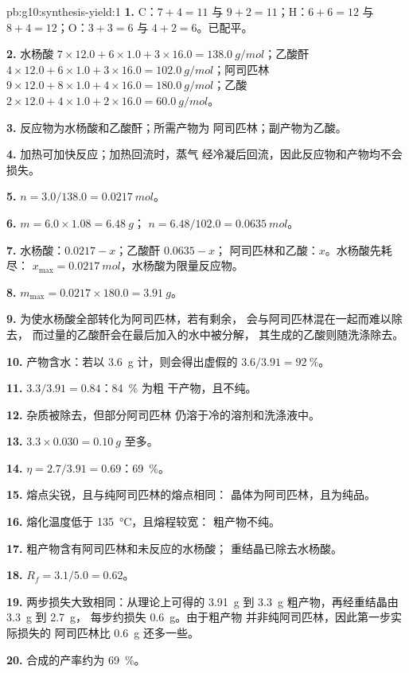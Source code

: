 \begin{solution}{pb:g10:synthesis-yield:1}
\textbf{1.} C：$7 + 4 = 11$ 与 $9 + 2 = 11$；H：$6 + 6 = 12$ 与
$8 + 4 = 12$；O：$3 + 3 = 6$ 与 $4 + 2 = 6$。已配平。

\textbf{2.} 水杨酸 $7 \times 12.0 + 6 \times 1.0 + 3 \times 16.0
= \qty{138.0}{g/mol}$；乙酸酐 $4 \times 12.0 + 6 \times 1.0 +
3 \times 16.0 = \qty{102.0}{g/mol}$；阿司匹林 $9 \times 12.0 + 8 \times
1.0 + 4 \times 16.0 = \qty{180.0}{g/mol}$；乙酸 $2 \times 12.0
+ 4 \times 1.0 + 2 \times 16.0 = \qty{60.0}{g/mol}$。

\textbf{3.} 反应物为水杨酸和乙酸酐；所需产物为
阿司匹林；副产物为乙酸。

\textbf{4.} 加热可加快反应；加热回流时，蒸气
经冷凝后回流，因此反应物和产物均不会损失。

\textbf{5.} $n = 3.0 / 138.0 = \qty{0.0217}{mol}$。

\textbf{6.} $m = 6.0 \times 1.08 = \qty{6.48}{g}$；
$n = 6.48 / 102.0 = \qty{0.0635}{mol}$。

\textbf{7.} 水杨酸：$0.0217 - x$；乙酸酐 $0.0635 - x$；
阿司匹林和乙酸：$x$。水杨酸先耗尽：
$x_{\max} = \qty{0.0217}{mol}$，水杨酸为限量反应物。

\textbf{8.} $m_{\max} = 0.0217 \times 180.0 = \qty{3.91}{g}$。

\textbf{9.} 为使水杨酸全部转化为阿司匹林，若有剩余，
会与阿司匹林混在一起而难以除去，
而过量的乙酸酐会在最后加入的水中被分解，
其生成的乙酸则随洗涤除去。

\textbf{10.} 产物含水：若以 \qty{3.6}{g} 计，则会得出虚假的
$3.6 / 3.91 = \qty{92}{\percent}$。

\textbf{11.} $3.3 / 3.91 = 0.84$：\qty{84}{\percent} 为粗
干产物，且不纯。

\textbf{12.} 杂质被除去，但部分阿司匹林
仍溶于冷的溶剂和洗涤液中。

\textbf{13.} $3.3 \times 0.030 = \qty{0.10}{g}$ 至多。

\textbf{14.} $\eta = 2.7 / 3.91 = 0.69$：\qty{69}{\percent}。

\textbf{15.} 熔点尖锐，且与纯阿司匹林的熔点相同：
晶体为阿司匹林，且为纯品。

\textbf{16.} 熔化温度低于 \qty{135}{\celsius}，且熔程较宽：
粗产物不纯。

\textbf{17.} 粗产物含有阿司匹林和未反应的水杨酸；
重结晶已除去水杨酸。

\textbf{18.} $R_f = 3.1 / 5.0 = 0.62$。

\textbf{19.} 两步损失大致相同：从理论上可得的 \qty{3.91}{g}
到 \qty{3.3}{g} 粗产物，再经重结晶由 \qty{3.3}{g} 到 \qty{2.7}{g}，
每步约损失 \qty{0.6}{g}。由于粗产物
并非纯阿司匹林，因此第一步实际损失的
阿司匹林比 \qty{0.6}{g} 还多一些。

\textbf{20.} 合成的产率约为 \qty{69}{\percent}。
\end{solution}
